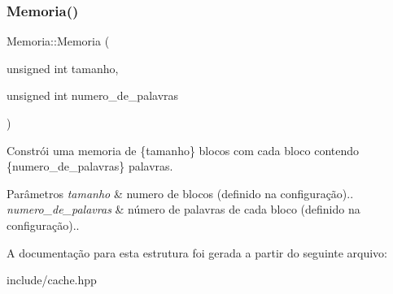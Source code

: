 \subsubsection{\texorpdfstring{Memoria()}{Memoria()}}
{\footnotesize\ttfamily Memoria\+::\+Memoria (\begin{DoxyParamCaption}\item[{unsigned int}]{tamanho,  }\item[{unsigned int}]{numero\+\_\+de\+\_\+palavras }\end{DoxyParamCaption})\hspace{0.3cm}{\ttfamily [inline]}}



Constrói uma memoria de \{tamanho\} blocos com cada bloco contendo \{numero\+\_\+de\+\_\+palavras\} palavras. 


\begin{DoxyParams}{Parâmetros}
{\em tamanho} & numero de blocos (definido na configuração).. \\
\hline
{\em numero\+\_\+de\+\_\+palavras} & número de palavras de cada bloco (definido na configuração).. \\
\hline
\end{DoxyParams}


A documentação para esta estrutura foi gerada a partir do seguinte arquivo\+:\begin{DoxyCompactItemize}
\item 
include/cache.\+hpp\end{DoxyCompactItemize}
